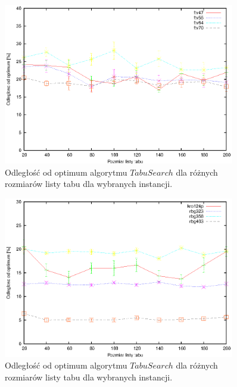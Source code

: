 \begin{figure}
\begin{center}
\includegraphics[width=0.9\textwidth]{wykresy/tabu_quality_size_3}
\end{center}
\caption{Odległość od optimum algorytmu $Tabu Search$ dla różnych rozmiarów
listy tabu dla wybranych instancji.}
\label{tabu_quality_size_3}
\end{figure}

\begin{figure}
\begin{center}
\includegraphics[width=0.9\textwidth]{wykresy/tabu_quality_size_4}
\end{center}
\caption{Odległość od optimum algorytmu $Tabu Search$ dla różnych rozmiarów
listy tabu dla wybranych instancji.}
\label{tabu_quality_size_5}
\end{figure}


